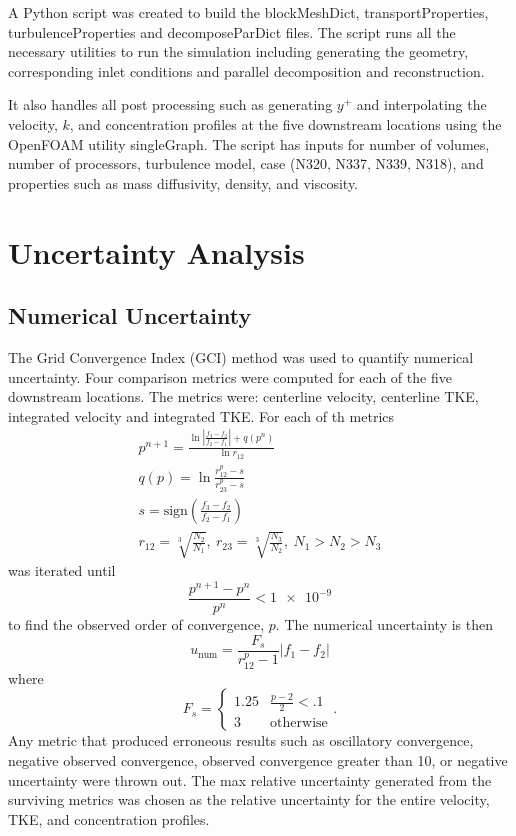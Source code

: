 \documentclass[11 pt]{article}
\begin{document}
	A Python script was created to build the blockMeshDict, transportProperties, turbulenceProperties and decomposeParDict files. The script runs all the necessary utilities to run the simulation including generating the geometry, corresponding inlet conditions and parallel decomposition and reconstruction. 

	It also handles all post processing such as generating $y^+$ and interpolating the velocity, $k$, and concentration profiles at the five downstream locations using the OpenFOAM utility singleGraph. The script has inputs for number of volumes, number of processors, turbulence model, case (N320, N337, N339, N318), and properties such as mass diffusivity, density, and viscosity. 

\section{Uncertainty Analysis}
\subsection{Numerical Uncertainty}
	The Grid Convergence Index (GCI) method was used to quantify numerical uncertainty. Four comparison metrics were computed for each of the five downstream locations. The metrics were: centerline velocity, centerline TKE, integrated velocity and integrated TKE. For each of th metrics
		\begin{equation}
		\begin{gathered}
			p^{n+1} = \frac{\ln{|\frac{f_3 - f_2}{f_2 - f_1}|} + q(p^n)}{\ln{r_{12}}} \\ 
			q(p) = \ln\frac{r_{12}^p - s}{r_{23}^p - s} \\ 
			s = \text{sign}\left(\frac{f_3 - f_2}{f_2 - f_1}\right) \\ 
			r_{12} = \sqrt[3]{\frac{N_2}{N_1}}, \ 
				r_{23} = \sqrt[3]{\frac{N_3}{N_2}}, \ 
				N_1 > N_2 > N_3 
		\end{gathered}
		\end{equation}
	was iterated until 
		\begin{equation}
			\frac{p^{n+1} - p^n}{p^n} < \num{1e-9}
		\end{equation}
	to find the observed order of convergence, $p$. The numerical uncertainty is then 
		\begin{equation}
			u_\text{num} = \frac{F_s}{r_{12}^p - 1} |f_1 - f_2|
		\end{equation}
	where 
		\begin{equation}
			F_s = \begin{cases}
				1.25 & \frac{p - 2}{2} < .1 \\ 
				3 & \text{otherwise}
			\end{cases}. 
		\end{equation}
	Any metric that produced erroneous results such as oscillatory convergence, negative observed convergence, observed convergence greater than 10, or negative uncertainty were thrown out. The max relative uncertainty generated from the surviving metrics was chosen as the relative uncertainty for the entire velocity, TKE, and concentration profiles. 
\end{document}
